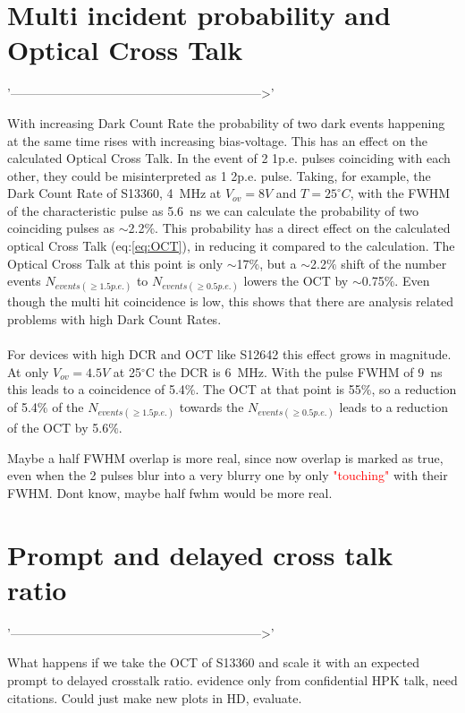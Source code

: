 \documentclass[12pt,article,type=msc,colorback,accentcolor=tud9c]{tudthesis}
\begin{document}
\clearpage
\section{Multi incident probability and Optical Cross Talk}
\label{appsec:multi_hit}
'------------------------------------------------------------>'

With increasing Dark Count Rate the probability of two dark events happening at the same time rises with increasing bias-voltage. This has an effect on the calculated Optical Cross Talk. In the event of 2 1p.e. pulses coinciding with each other, they could be misinterpreted as 1 2p.e. pulse. Taking, for example, the Dark Count Rate of S13360, 4~MHz at $V_{ov}=8V$ and $T=25^\circ C$, with the FWHM of the characteristic pulse as 5.6~ns we can calculate the probability of two coinciding pulses as $\sim$2.2$\%$. This probability has a direct effect on the calculated optical Cross Talk (eq:\ref{eq:OCT}), in reducing it compared to the calculation. The Optical Cross Talk at this point is only $\sim$17$\%$, but a $\sim$2.2$\%$ shift of the number events $N_{events(\geq 1.5p.e.)}$ to $N_{events(\geq 0.5p.e.)}$ lowers the OCT by $\sim$0.75$\%$. Even though the multi hit coincidence is low, this shows that there are analysis related problems with high Dark Count Rates.\\\\

For devices with high DCR and OCT like S12642 this effect grows in magnitude. At only $V_{ov}=4.5V$ at 25$^\circ$C the DCR is 6~MHz. With the pulse FWHM of 9~ns this leads to a coincidence of 5.4$\%$. The OCT at that point is 55$\%$, so a reduction of 5.4$\%$ of the $N_{events(\geq 1.5p.e.)}$ towards the $N_{events(\geq 0.5p.e.)}$ leads to a reduction of the OCT by 5.6$\%$.

Maybe a half FWHM overlap is more real, since now overlap is marked as true, even when the 2 pulses blur into a very blurry one by only \textcolor{red}{"touching"} with their FWHM. Dont know, maybe half fwhm would be more real.



\section{Prompt and delayed cross talk ratio}
'------------------------------------------------------------>'

What happens if we take the OCT of S13360 and scale it with an expected prompt to delayed crosstalk ratio. evidence only from confidential HPK talk, need citations. Could just make new plots in HD, evaluate.





\clearpage
\newpage



\end{document}
